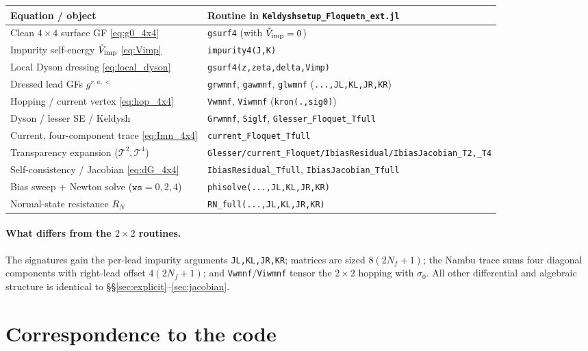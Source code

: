 \documentclass[11pt,a4paper]{article}
\begin{document}
\begin{center}
\renewcommand{\arraystretch}{1.25}
\begin{tabular}{ll}
\hline
\textbf{Equation / object} & \textbf{Routine in \texttt{Keldyshsetup\_Floquetn\_ext.jl}}\\
\hline
Clean $4\times4$ surface GF \eqref{eq:g0_4x4} & \texttt{gsurf4} (with $\check V_{\rm imp}=0$)\\
Impurity self-energy $\check V_{\rm imp}$ \eqref{eq:Vimp} & \texttt{impurity4(J,K)}\\
Local Dyson dressing \eqref{eq:local_dyson} & \texttt{gsurf4(z,zeta,delta,Vimp)}\\
Dressed lead GFs $g^{r,a,<}$ & \texttt{grwmnf}, \texttt{gawmnf}, \texttt{glwmnf} (\texttt{...,JL,KL,JR,KR})\\
Hopping / current vertex \eqref{eq:hop_4x4} & \texttt{Vwmnf}, \texttt{Viwmnf} (\verb|kron(.,sig0)|)\\
Dyson / lesser SE / Keldysh & \texttt{Grwmnf}, \texttt{Siglf}, \texttt{Glesser\_Floquet\_Tfull}\\
Current, four-component trace \eqref{eq:Imn_4x4} & \texttt{current\_Floquet\_Tfull}\\
Transparency expansion ($\mathcal T^2,\mathcal T^4$) & \texttt{Glesser/current\_Floquet/IbiasResidual/IbiasJacobian\_T2,\_T4}\\
Self-consistency / Jacobian \eqref{eq:dG_4x4} & \texttt{IbiasResidual\_Tfull}, \texttt{IbiasJacobian\_Tfull}\\
Bias sweep + Newton solve ($\texttt{ws}=0,2,4$) & \texttt{phisolve(...,JL,KL,JR,KR)}\\
Normal-state resistance $R_N$ & \texttt{RN\_full(...,JL,KL,JR,KR)}\\
\hline
\end{tabular}
\end{center}

\paragraph{What differs from the $2\times2$ routines.}
The signatures gain the per-lead impurity arguments \texttt{JL,KL,JR,KR}; matrices
are sized $8(2N_f+1)$; the Nambu trace sums four diagonal components with
right-lead offset $4(2N_f+1)$; and \texttt{Vwmnf}/\texttt{Viwmnf} tensor the
$2\times2$ hopping with $\sigma_0$.  All other differential and algebraic
structure is identical to \S\S\ref{sec:explicit}--\ref{sec:jacobian}.

\section{Correspondence to the code}
\label{sec:codemap}
\end{document}
